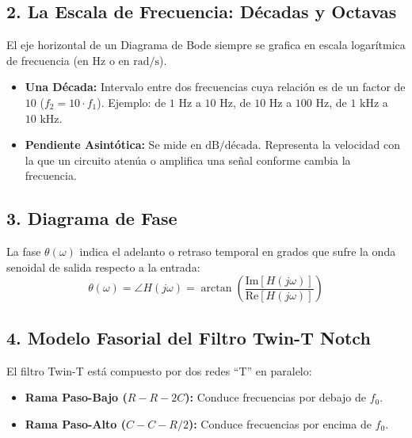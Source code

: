 \documentclass[11pt,a4paper,twoside]{article}
\begin{document}
\subsection*{2. La Escala de Frecuencia: Décadas y Octavas}
El eje horizontal de un Diagrama de Bode siempre se grafica en escala logarítmica de frecuencia (en $\text{Hz}$ o en $\text{rad/s}$).
\begin{itemize}
    \item \textbf{Una Década:} Intervalo entre dos frecuencias cuya relación es de un factor de $10$ ($f_2 = 10 \cdot f_1$). Ejemplo: de $1\text{ Hz}$ a $10\text{ Hz}$, de $10\text{ Hz}$ a $100\text{ Hz}$, de $1\text{ kHz}$ a $10\text{ kHz}$.
    \item \textbf{Pendiente Asintótica:} Se mide en $\text{dB/década}$. Representa la velocidad con la que un circuito atenúa o amplifica una señal conforme cambia la frecuencia.
\end{itemize}

\subsection*{3. Diagrama de Fase}
La fase $\theta(\omega)$ indica el adelanto o retraso temporal en grados que sufre la onda senoidal de salida respecto a la entrada:
\begin{equation}
    \theta(\omega) = \angle H(j\omega) = \arctan\left(\frac{\text{Im}[H(j\omega)]}{\text{Re}[H(j\omega)]}\right)
\end{equation}

\subsection*{4. Modelo Fasorial del Filtro Twin-T Notch}
El filtro Twin-T está compuesto por dos redes ``T'' en paralelo:
\begin{itemize}
    \item \textbf{Rama Paso-Bajo ($R-R-2C$):} Conduce frecuencias por debajo de $f_0$.
    \item \textbf{Rama Paso-Alto ($C-C-R/2$):} Conduce frecuencias por encima de $f_0$.
\end{itemize}
\end{document}
